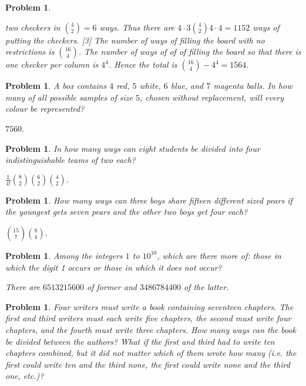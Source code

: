 \documentclass[11pt, openany]{book}
\theoremstyle{change} \theoremheaderfont{\blue\sffamily\bfseries}
\newtheorem{pro}[thm]{Problem}
\theoremstyle{nonumberplain} \theoremheaderfont{\sffamily\bfseries}
\def\binom#1#2{{#1\choose#2}}
\newcommand{\í}{\'{\i}}
\begin{document}
\begin{multicols}{2}
\begin{pro}
\begin{answer} [1]
two checkers in $\binom{4}{2} = 6$ ways. Thus there are $4 \cdot 3
\binom{4}{2} 4\cdot 4 = 1152$ ways of putting the checkers. [3]  The
number of ways of filling the board with no restrictions is
$\binom{16}{4}$. The number of ways of of of filling the board so
that there is one checker per column is $4^4$. Hence the total is
$\binom{16}{4} - 4^4 = 1564$.
\end{answer}
    \end{pro}
   \begin{pro}
A box contains $4$ red, $5$ white, $6$ blue, and $7$ magenta balls.
In how many of all possible samples of size $5$, chosen without
replacement, will every colour be represented?
\begin{answer} $7560$.
\end{answer}
  \end{pro}
     \begin{pro} In how many ways can eight students be divided into four
indistinguishable teams of two each?\begin{answer} $\frac{1}{4!}
\binom{8}{2} \binom{6}{2} \binom{4}{2}.$
\end{answer}
   \end{pro}
     \begin{pro} How many ways can three boys share fifteen different sized
pears if the youngest gets seven pears and the other two boys get
four each?\begin{answer} $\binom{15}{7} \binom{8}{4}.$
\end{answer}      \end{pro}         \begin{pro} Among the integers $1$ to $10^{10}$, which are there more of:
those in which the digit 1 occurs or those in which it does not
occur?\begin{answer} There are $6513215600$ of former and
$3486784400$ of the latter.
\end{answer}
  \end{pro}
    \begin{pro} Four writers must write a book containing seventeen chapters.
The first and third writers must each write five chapters, the
second must write four chapters, and the fourth must write three
chapters.  How many ways can the book be divided between the
authors?  What if the first and third had to write ten chapters
combined, but it did not matter which of them wrote how many (i.e.
the first could write ten and the third none, the first could write
none and the third one, etc.)?
\end{pro}
\end{multicols}
\end{document}
